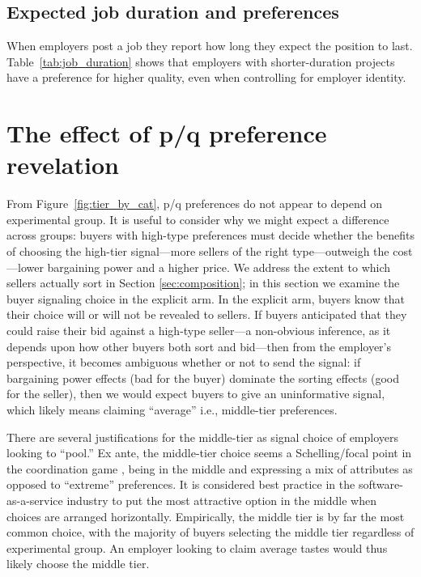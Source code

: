 \documentclass[prodmode,acmec]{ec-acmsmall}
\begin{document}
\subsection{Expected job duration and preferences} 
When employers post a job they report how long they expect the position to last. 
Table~\ref{tab:job_duration} shows that employers with shorter-duration projects have a preference for higher quality, 
even when controlling for employer identity.  


\section{The effect of p/q preference revelation}
\label{sec:pqreveal}

From Figure~\ref{fig:tier_by_cat}, p/q preferences do not appear to depend on experimental group.
It is useful to consider why we might expect a difference across groups:
buyers with high-type preferences must decide whether the benefits of choosing the high-tier signal---more sellers of the right type---outweigh the cost---lower bargaining power and a higher price.  
We address the extent to which sellers actually sort in Section \ref{sec:composition}; in this section we examine the buyer signaling choice in the explicit arm.
In the explicit arm, buyers know that their choice will or will not be revealed to sellers.
If buyers anticipated that they could raise their bid against a high-type seller---a non-obvious inference, as it depends upon how other buyers both sort and bid---then from the employer's perspective, it becomes ambiguous whether or not to send the signal: 
if bargaining power effects (bad for the buyer) dominate the sorting effects (good for the seller), then we would expect buyers to give an uninformative signal, which likely means claiming ``average'' i.e., middle-tier preferences.

There are several justifications for the middle-tier as signal choice of employers looking to ``pool.''
Ex ante, the middle-tier choice seems a Schelling/focal point in the coordination game \citep{schelling1980strategy}, being in the middle and expressing a mix of attributes as opposed to ``extreme'' preferences.
It is considered best practice in the software-as-a-service industry to put the most attractive option in the middle when choices are arranged horizontally. 
Empirically, the middle tier is by far the most common choice, with the majority of buyers selecting the middle tier regardless of experimental group.
An employer looking to claim average tastes would thus likely choose the middle tier. 
\end{document}
